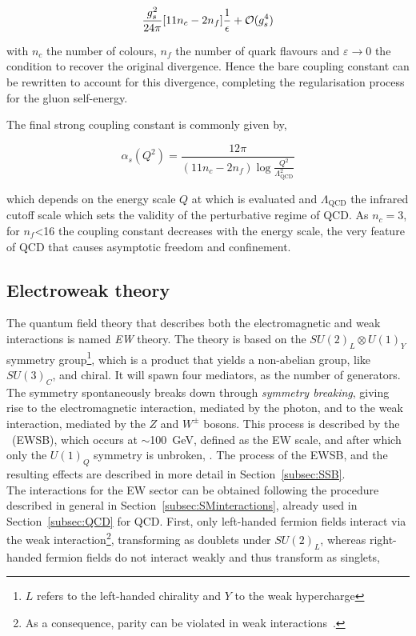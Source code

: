 \begin{equation}
    \frac{g_s^2}{24\pi}\qty[11n_c-2 n_f]\frac{1}{\epsilon}+\mathcal{O}(g_s^4)
\end{equation}

with $n_c$ the number of colours, $n_f$ the number of quark flavours and $\varepsilon\to 0$ the condition to recover the original divergence. Hence the bare coupling constant can be rewritten to account for this divergence, completing the regularisation process for the gluon self-energy.

The final strong coupling constant is commonly given by, 

\begin{equation}
    \label{Theory_eq:runningcoupling}
    \alpha_s(Q^2) = \frac{12\pi}{(11n_c - 2 n_f)\log \frac{Q^2}{\Lambda^2_\text{QCD}}}
\end{equation}

which depends on the energy scale $Q$ at which is evaluated and $\Lambda_\text{QCD}$ the infrared cutoff scale which sets the validity of the perturbative regime of \acrshort{QCD}. As $n_c=3$, for $n_f$<16 the coupling constant decreases with the energy scale, the very feature of \acrshort{QCD} that causes asymptotic freedom and confinement.

\subsection{Electroweak theory}

The quantum field theory that describes both the electromagnetic and weak interactions is named \textit{\acrlong{EW}} theory. The theory is based on the $SU(2)_L\otimes U(1)_Y$ symmetry group\footnote{$L$ refers to the left-handed chirality and $Y$ to the weak hypercharge}, which is a product that yields a non-abelian group, like $SU(3)_C$, and chiral. It will spawn four mediators, as the number of generators.
The symmetry spontaneously breaks down through \textit{symmetry breaking}, giving rise to the electromagnetic interaction,
mediated by the photon, and to the weak interaction, mediated by the $Z$ and $W^\pm$ bosons.
This process is described by the \textit{}~(\acrshort{EWSB}), which occurs at $\sim$100~GeV, defined as the \acrshort{EW} scale, and after which only the $U(1)_Q$ symmetry is unbroken,
. The process of the \acrshort{EWSB}, and the resulting effects are described in
more detail in Section~\ref{subsec:SSB}.\\

The interactions for the \acrshort{EW} sector can be obtained following the procedure described in general in Section~\ref{subsec:SMinteractions},
already used in Section~\ref{subsec:QCD} for \acrshort{QCD}. First, only left-handed fermion fields interact via the weak
interaction\footnote{As a consequence, parity can be violated in weak interactions~\cite{Lee,Wu}.},
transforming as doublets under $SU(2)_L$, whereas right-handed fermion fields do not interact weakly and thus transform as singlets,

